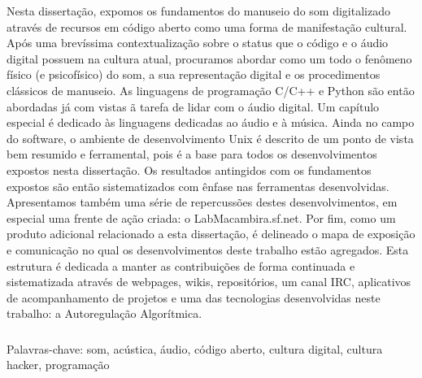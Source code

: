 \begin{resumo}
Nesta dissertação, expomos os fundamentos do manuseio do som digitalizado através de recursos em código aberto como
uma forma de manifestação cultural.
Após uma brevíssima contextualização sobre o status que o código e o áudio digital possuem na cultura atual, procuramos abordar como um todo o fenômeno
físico (e psicofísico) do som, a sua representação digital e os procedimentos clássicos de manuseio. As linguagens de programação C/C++ e Python
são então abordadas já com vistas ã tarefa de lidar com o áudio digital. Um capítulo especial é dedicado às linguagens dedicadas ao áudio e à música. Ainda no campo do software,
o ambiente de desenvolvimento Unix é descrito de um ponto
de vista bem resumido e ferramental, pois é a base para todos os desenvolvimentos expostos nesta dissertação.
Os resultados antingidos com os fundamentos expostos são então sistematizados com ênfase nas ferramentas desenvolvidas.
Apresentamos também uma série de repercussões destes desenvolvimentos, em especial uma frente de ação criada: o LabMacambira.sf.net.
Por fim, como um produto adicional relacionado a esta dissertação, é delineado o mapa de exposição e comunicação no qual
os desenvolvimentos deste trabalho estão agregados. Esta estrutura é dedicada a manter as contribuições
de forma continuada e sistematizada através de webpages, wikis, repositórios, um canal IRC, aplicativos de acompanhamento de projetos
e uma das tecnologias desenvolvidas neste trabalho: a Autoregulação Algorítmica.


$\phantom{linha em branco}$\\
Palavras-chave: som, acústica, áudio, código aberto, cultura digital, cultura hacker, programação

\end{resumo}

